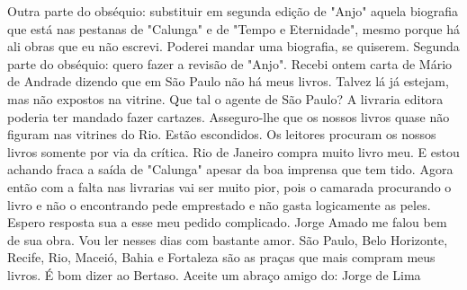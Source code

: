 Outra parte do obséquio: substituir em segunda edição de "Anjo" aquela biografia que está nas pestanas de "Calunga" e de "Tempo e Eternidade", mesmo porque há ali obras que eu não escrevi. Poderei mandar uma biografia, se quiserem. Segunda parte do obséquio: quero fazer a revisão de "Anjo". Recebi ontem carta de Mário de Andrade dizendo que em São Paulo não há meus livros.
Talvez lá já estejam, mas não expostos na vitrine. Que tal o agente de São Paulo? A livraria editora poderia ter mandado fazer cartazes. Asseguro-lhe que os nossos livros quase não figuram nas vitrines do Rio. Estão escondidos.
Os leitores procuram os nossos livros somente por via da crítica. Rio de Janeiro compra muito livro meu. E estou achando fraca a saída de "Calunga" apesar da boa imprensa que tem tido. Agora então com a falta nas livrarias vai ser muito pior, pois o camarada procurando o livro e não o encontrando pede emprestado e não gasta logicamente as peles.
Espero resposta sua a esse meu pedido complicado. Jorge Amado me falou bem de sua obra. Vou ler nesses dias com bastante amor. São Paulo, Belo Horizonte, Recife, Rio, Maceió, Bahia e Fortaleza são as praças que mais compram meus livros. É bom dizer ao Bertaso. Aceite um abraço amigo do:
Jorge de Lima

